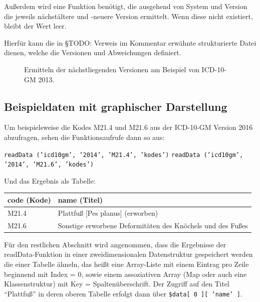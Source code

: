 Außerdem wird eine Funktion benötigt, die ausgehend von System und Version die jeweils nächstältere und -neuere Version ermittelt. Wenn diese nicht existiert, bleibt der Wert leer. 

Hierfür kann die in %
{\color{blue} §TODO: Verweis im Kommentar}
erwähnte strukturierte Datei dienen, welche die Versionen und Abweichungen definiert. 


\begin{figure}[H]
    \centering\large%
    \resizebox{.99\linewidth}{!}{}
    \normalsize\vspace{-1em}\caption{Ermitteln der nächstliegenden Versionen am Beispiel von ICD-10-GM 2013.}
\end{figure}

\subsection{Beispieldaten mit graphischer Darstellung}

Um beispielsweise die Kodes M21.4 und M21.6 aus der ICD-10-GM Version 2016 abzufragen, sehen die Funktionsaufrufe dann so aus:

\texttt{readData ('icd10gm', '2014', 'M21.4', 'kodes')} \newline
\texttt{readData ('icd10gm', '2014', 'M21.6', 'kodes')}

Und das Ergebnis als Tabelle:

\begin{centernss}
\renewcommand{\arraystretch}{1.2}
\setlength{\tabcolsep}{12pt}
\begin{tabular}{ll}
code (Kode) & name (Titel) \\
\hline
M21.4 & Plattfuß [Pes planus] (erworben) \\
M21.6 & Sonstige erworbene Deformitäten des Knöchels und des Fußes \\
\end{tabular}
\end{centernss}

Für den restlichen Abschnitt wird angenommen, dass die Ergebnisse der readData-Funktion in einer zweidimensionalen Datenstruktur gespeichert werden die einer Tabelle ähneln, das heißt eine Array-Liste mit einem Eintrag pro Zeile beginnend mit Index = 0, sowie einem assoziativen Array (Map oder auch eine Klassenstruktur) mit Key = Spaltenüberschrift. Der Zugriff auf den Titel "`Plattfuß"' in deren oberen Tabelle erfolgt dann über \texttt{\$data[ 0 ][ 'name' ]}.

